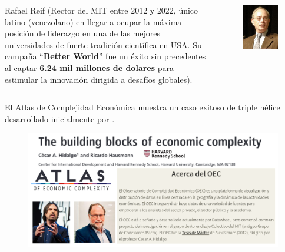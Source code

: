 \documentclass[aspectratio=169]{beamer}
\begin{document}
\begin{frame}
\begin{columns}
\begin{column}{0.5\textwidth}
Rafael Reif (Rector del MIT entre 2012 y 2022, único latino (venezolano) en llegar a ocupar la máxima posición de liderazgo en una de las mejores universidades de fuerte tradición científica en USA. Su campaña ``\textbf{Better World}'' fue un éxito sin precedentes al captar \textbf{6.24 mil millones de dolares} para estimular la innovación dirigida a desafíos globales).\\
\end{column}
\begin{column}{0.5\textwidth}
\begin{figure}
\includegraphics[width=.6\textwidth]{Reif.jpg}
\end{figure}   
\end{column}
\end{columns}
\end{frame}

\begin{frame}
El Atlas de Complejidad Económica muestra un caso exitoso de triple hélice desarrollado inicialmente por \textcite{hidalgo2009}.
\begin{figure}
\includegraphics[width=.7\textwidth]{Atlas.png}
\end{figure}
\end{frame}
\end{document}
